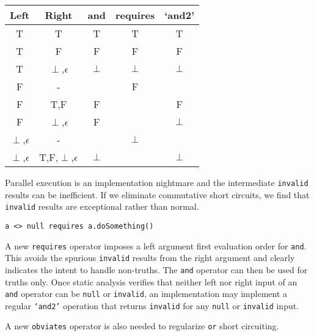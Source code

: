 \documentclass{llncs}
\begin{document}
\begin{center}
	\begin{tabular}{|c|c||c|c|c|} 
		\hline
		Left & Right & and & requires & `and2' \\ [0.5ex] 
		\hline
		T & T & T & T & T \\ 
		T & F & F & F & F \\
		T & $\perp$,$\epsilon$ & $\perp$ & $\perp$ & $\perp$ \\
		F & - & & F & \\
		F & T,F & F & & F \\
		F & $\perp$,$\epsilon$ & F & & $\perp$ \\
		$\perp$,$\epsilon$ & - & & $\perp$ & \\ 
		$\perp$,$\epsilon$ & T,F,$\perp$,$\epsilon$ & $\perp$ & & $\perp$ \\ 
		\hline
	\end{tabular}
\end{center}

Parallel execution is an implementation nightmare and the intermediate \texttt{invalid} results can be inefficient. If we eliminate commutative short circuits, we find that \texttt{invalid} results are exceptional rather than normal.

\texttt{a <> null requires a.doSomething()}

A new \texttt{requires} operator imposes a left argument first evaluation order for \texttt{and}. This avoids the spurious \texttt{invalid} results from the right argument and clearly indicates the intent to handle non-truths. The \texttt{and} operator can then be used for truths only. Once static analysis verifies that neither left nor right input of an \texttt{and} operator can be \texttt{null} or \texttt{invalid}, an implementation may implement a regular \texttt{`and2'} operation that returns \texttt{invalid} for any \texttt{null} or \texttt{invalid} input.

A new \texttt{obviates} operator is also needed to regularize \texttt{or} short circuiting.



\end{document}
